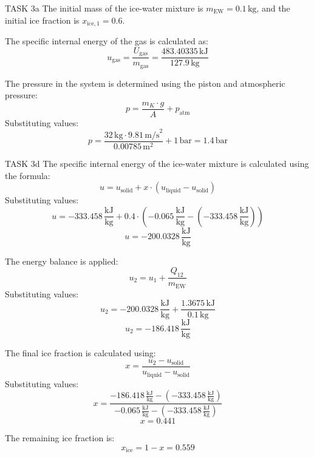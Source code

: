 TASK 3a  
The initial mass of the ice-water mixture is \( m_{\text{EW}} = 0.1 \, \text{kg} \), and the initial ice fraction is \( x_{\text{ice},1} = 0.6 \).  

The specific internal energy of the gas is calculated as:  
\[
u_{\text{gas}} = \frac{U_{\text{gas}}}{m_{\text{gas}}} = \frac{483.40335 \, \text{kJ}}{127.9 \, \text{kg}}
\]  

The pressure in the system is determined using the piston and atmospheric pressure:  
\[
p = \frac{m_K \cdot g}{A} + p_{\text{atm}}
\]  
Substituting values:  
\[
p = \frac{32 \, \text{kg} \cdot 9.81 \, \text{m/s}^2}{0.00785 \, \text{m}^2} + 1 \, \text{bar} = 1.4 \, \text{bar}
\]  

TASK 3d  
The specific internal energy of the ice-water mixture is calculated using the formula:  
\[
u = u_{\text{solid}} + x \cdot (u_{\text{liquid}} - u_{\text{solid}})
\]  
Substituting values:  
\[
u = -333.458 \, \frac{\text{kJ}}{\text{kg}} + 0.4 \cdot (-0.065 \, \frac{\text{kJ}}{\text{kg}} - (-333.458 \, \frac{\text{kJ}}{\text{kg}}))
\]  
\[
u = -200.0328 \, \frac{\text{kJ}}{\text{kg}}
\]  

The energy balance is applied:  
\[
u_2 = u_1 + \frac{Q_{12}}{m_{\text{EW}}}
\]  
Substituting values:  
\[
u_2 = -200.0328 \, \frac{\text{kJ}}{\text{kg}} + \frac{1.3675 \, \text{kJ}}{0.1 \, \text{kg}}
\]  
\[
u_2 = -186.418 \, \frac{\text{kJ}}{\text{kg}}
\]  

The final ice fraction is calculated using:  
\[
x = \frac{u_2 - u_{\text{solid}}}{u_{\text{liquid}} - u_{\text{solid}}}
\]  
Substituting values:  
\[
x = \frac{-186.418 \, \frac{\text{kJ}}{\text{kg}} - (-333.458 \, \frac{\text{kJ}}{\text{kg}})}{-0.065 \, \frac{\text{kJ}}{\text{kg}} - (-333.458 \, \frac{\text{kJ}}{\text{kg}})}
\]  
\[
x = 0.441
\]  

The remaining ice fraction is:  
\[
x_{\text{ice}} = 1 - x = 0.559
\]